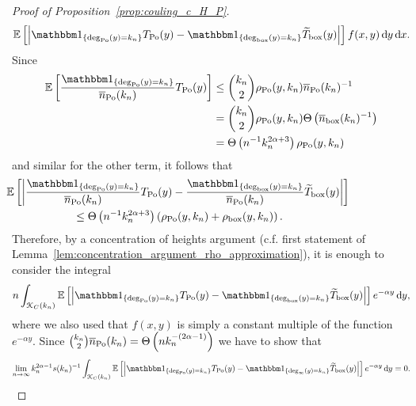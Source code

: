 \begin{proof}[Proof of Proposition~\ref{prop:couling_c_H_P}]
\begin{align*}
	        \Exp{\left|\ind{\mathrm{deg}_{\Po}(y) = k_n} T_{\Po}(y)
	        - \ind{\mathrm{deg}_{\mathrm{box}}(y) = k_n} \widetilde{T}_{\text{box}}(y)\right|} 
	        	f(x,y) \dd y \dd x.
\end{align*}
Since 
\begin{align*}
	\Exp{\frac{\ind{\mathrm{deg}_{\Po}(y) = k_n}}{\expH} T_{\Po}(y)}
	&\le \binom{k_n}{2} \rho_{\Po}(y,k_n)\expH^{-1} \\
	&= \binom{k_n}{2} \rho_{\Po}(y,k_n)\bigT{\expP^{-1}}\\
	&= \bigT{n^{-1} k_n^{2\alpha + 3}}\rho_{\Po}(y,k_n)
\end{align*}
and similar for the other term, it follows that
\begin{align*}
	&\hspace{-60pt}\Exp{ \left| \frac{\ind{\mathrm{deg}_{\Po}(y) = k_n}}{\expH} T_{\Po}(y)
		- \frac{\ind{\mathrm{deg}_{\mathrm{box}}(y) = k_n}}{\expH}  \widetilde{T}_{\text{box}}(y)\right|} \\
	&\le \bigT{n^{-1} k_n^{2\alpha + 3}}\left(\rho_{\Po}(y,k_n) + \rho_{\text{box}}(y,k_n)\right).
\end{align*}
Therefore, by a concentration of heights argument (c.f. first statement of Lemma~\ref{lem:concentration_argument_rho_approximation}), it is enough to consider the integral
\begin{equation} \label{eq:expectation_total}
	n \int_{\Kcal_{C}(k_n)} \Exp{\left|\ind{\mathrm{deg}_{\Po}(y) = k_n} T_{\Po}(y)
		- \ind{\mathrm{deg}_{\mathrm{box}}(y) = k_n} \widetilde{T}_{\mathrm{box}}(y)\right|} e^{-\alpha y} \dd y,
\end{equation}
where we also used that $f(x,y)$ is simply a constant multiple of the function $e^{-\alpha y}$. Since $\binom{k_n}{2}\overline{n}_{{\mathrm{Po}}}(k_n)
= \Theta\left(n k_n^{-(2\alpha - 1)}\right)$ we have to show that
\[
	\lim_{n \to \infty} k_n^{2\alpha - 1} s(k_n)^{-1} \int_{\Kcal_{C}(k_n)} 
		\Exp{\left|\ind{\mathrm{deg}_{\Po}(y) = k_n} T_{\Po}(y)
			- \ind{\mathrm{deg}_{\infty}(y) = k_n} \widetilde{T}_{\mathrm{box}}(y)\right|} e^{-\alpha y} \dd y = 0.
\] 


\end{proof}
